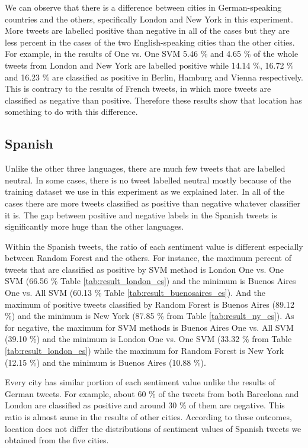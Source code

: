 We can observe that there is a difference between cities in German-speaking countries and the others, specifically London and New York in this experiment.
More tweets are labelled positive than negative in all of the cases but they are less percent in the cases of the two English-speaking cities than the other cities.
For example, in the results of One vs. One SVM 5.46 \% and 4.65 \% of the whole tweets from London and New York are labelled positive while 14.14 \%, 16.72 \% and 16.23 \% are classified as positive in Berlin, Hamburg and Vienna respectively. 
This is contrary to the results of French tweets, in which more tweets are classified as negative than positive.
Therefore these results show that location has something to do with this difference.
\subsection{Spanish}
Unlike the other three languages, there are much few tweets that are labelled neutral.
In some cases, there is no tweet labelled neutral mostly because of the training dataset we use in this experiment as we explained later.
In all of the cases there are more tweets classified as positive than negative whatever classifier it is.
The gap between positive and negative labels in the Spanish tweets is significantly more huge than the other languages. 

Within the Spanish tweets, the ratio of each sentiment value is different especially between Random Forest and the others.
For instance, the maximum percent of tweets that are classified as positive by SVM method is London One vs. One SVM (66.56 \% Table \ref{tab:result_london_es}) and the minimum is Buenos Aires One vs. All SVM (60.13 \% Table \ref{tab:result_buenosaires_es}).
And the maximum of positive tweets classified by Random Forest is Buenos Aires (89.12 \%) and the minimum is New York (87.85 \% from Table \ref{tab:result_ny_es}). 
As for negative, the maximum for SVM methods is Buenos Aires One vs. All SVM (39.10 \%) and the minimum is London One vs. One SVM (33.32 \% from Table \ref{tab:result_london_es}) while the maximum for Random Forest is New York (12.15 \%) and the minimum is Buenos Aires (10.88 \%).

Every city has similar portion of each sentiment value unlike the results of German tweets.
For example, about 60 \% of the tweets from both Barcelona and London are classified as positive and around 30 \% of them are negative.
This ratio is almost same in the results of other cities.
According to these outcomes, location does not differ the distributions of sentiment values of Spanish tweets we obtained from the five cities.


